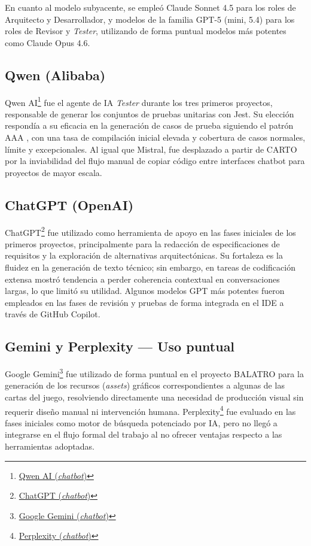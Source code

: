 En cuanto al modelo subyacente, se empleó Claude Sonnet 4.5 para los roles de Arquitecto y Desarrollador, y modelos de la familia GPT-5 (mini, 5.4) para los roles de Revisor y \textit{Tester}, utilizando de forma puntual modelos más potentes como Claude Opus 4.6.

\subsection{Qwen (Alibaba)} \label{subsec:qwen}

Qwen AI\footnote{\href{https://qwen.ai/home}{Qwen AI (\textit{chatbot})}} fue el agente de \ac{IA} \textit{Tester} durante los tres primeros proyectos, responsable de generar los conjuntos de pruebas unitarias con Jest. 
Su elección respondía a su eficacia en la generación de casos de prueba siguiendo el patrón \ac{AAA} \cite{Wei:2024:AAA}, con una tasa de compilación inicial elevada y cobertura de casos normales, límite y excepcionales.
Al igual que Mistral, fue desplazado a partir de \ac{CARTO} por la inviabilidad del flujo manual de copiar código entre interfaces chatbot para proyectos de mayor escala.

\subsection{ChatGPT (OpenAI)} \label{subsec:chatgpt}

ChatGPT\footnote{\href{https://chatgpt.com}{ChatGPT (\textit{chatbot})}} fue utilizado como herramienta de apoyo en las fases iniciales de los primeros proyectos, principalmente para la redacción de especificaciones de requisitos y la exploración de alternativas arquitectónicas.
Su fortaleza es la fluidez en la generación de texto técnico; sin embargo, en tareas de codificación extensa mostró tendencia a perder coherencia contextual en conversaciones largas, lo que limitó su utilidad.
Algunos modelos GPT más potentes fueron empleados en las fases de revisión y pruebas de forma integrada en el \ac{IDE} a través de GitHub Copilot.

\subsection{Gemini y Perplexity --- Uso puntual} \label{subsec:others}

Google Gemini\footnote{\href{https://gemini.google.com/app}{Google Gemini (\textit{chatbot})}} fue utilizado de forma puntual en el proyecto \ac{BALATRO} para la generación de los recursos (\textit{assets}) gráficos correspondientes a algunas de las cartas del juego, resolviendo directamente una necesidad de producción visual sin requerir diseño manual ni intervención humana. Perplexity\footnote{\href{https://www.perplexity.ai}{Perplexity (\textit{chatbot})}} fue evaluado en las fases iniciales como motor de búsqueda potenciado por \ac{IA}, pero no llegó a integrarse en el flujo formal del trabajo al no ofrecer ventajas respecto a las herramientas adoptadas.

